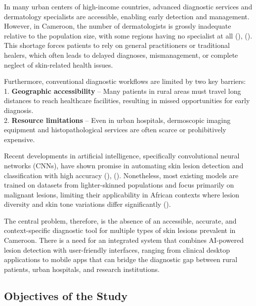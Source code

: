 \documentclass[
  12pt,
  oneside]{article}
\begin{document}
In many urban centers of high-income countries, advanced diagnostic
services and dermatology specialists are accessible, enabling early
detection and management. However, in Cameroon, the number of
dermatologists is grossly inadequate relative to the population size,
with some regions having no specialist at all
(),
(). This shortage
forces patients to rely on general practitioners or traditional healers,
which often leads to delayed diagnoses, mismanagement, or complete
neglect of skin-related health issues.

Furthermore, conventional diagnostic workflows are limited by two key
barriers:\\
1. \textbf{Geographic accessibility} -- Many patients in rural areas
must travel long distances to reach healthcare facilities, resulting in
missed opportunities for early diagnosis.\\
2. \textbf{Resource limitations} -- Even in urban hospitals, dermoscopic
imaging equipment and histopathological services are often scarce or
prohibitively expensive.

Recent developments in artificial intelligence, specifically
convolutional neural networks (CNNs), have shown promise in automating
skin lesion detection and classification with high accuracy
(),
(). Nonetheless,
most existing models are trained on datasets from lighter-skinned
populations and focus primarily on malignant lesions, limiting their
applicability in African contexts where lesion diversity and skin tone
variations differ significantly ().

The central problem, therefore, is the absence of an accessible,
accurate, and context-specific diagnostic tool for multiple types of
skin lesions prevalent in Cameroon. There is a need for an integrated
system that combines AI-powered lesion detection with user-friendly
interfaces, ranging from clinical desktop applications to mobile apps
that can bridge the diagnostic gap between rural patients, urban
hospitals, and research institutions.

\subsection{Objectives of the Study}\label{objectives-of-the-study}
\end{document}
